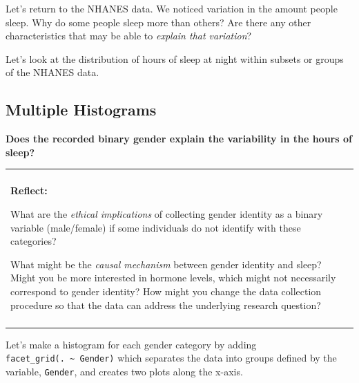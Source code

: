 \documentclass[
]{book}
\newenvironment{Shaded}{\begin{snugshade}}{\end{snugshade}}
\newcommand{\DataTypeTok}[1]{\textcolor[rgb]{0.13,0.29,0.53}{#1}}
\newcommand{\DecValTok}[1]{\textcolor[rgb]{0.00,0.00,0.81}{#1}}
\newcommand{\KeywordTok}[1]{\textcolor[rgb]{0.13,0.29,0.53}{\textbf{#1}}}
\newcommand{\NormalTok}[1]{#1}
\newcommand{\OperatorTok}[1]{\textcolor[rgb]{0.81,0.36,0.00}{\textbf{#1}}}
\newcommand{\StringTok}[1]{\textcolor[rgb]{0.31,0.60,0.02}{#1}}
\newenvironment{reflect}
{
    \begin{center}
    
    \begin{tabular}{|p{0.8\textwidth}|}
    \rowcolor{LightBlue}
    \hline\\
    \rowcolor{LightBlue}
    \textbf{Reflect:}
}
{
    \\\rowcolor{LightBlue}
    \\\hline
    \end{tabular} 
    \end{center}
}
\begin{document}
Let's return to the NHANES data. We noticed variation in the amount people sleep. Why do some people sleep more than others? Are there any other characteristics that may be able to \emph{explain that variation}?

Let's look at the distribution of hours of sleep at night within subsets or groups of the NHANES data.

\hypertarget{multiple-histograms}{%
\subsection{Multiple Histograms}\label{multiple-histograms}}

\textbf{Does the recorded binary gender explain the variability in the hours of sleep?}

\begin{reflect}
What are the \emph{ethical implications} of collecting gender identity
as a binary variable (male/female) if some individuals do not identify
with these categories?

What might be the \emph{causal mechanism} between gender identity and
sleep? Might you be more interested in hormone levels, which might not
necessarily correspond to gender identity? How might you change the data
collection procedure so that the data can address the underlying
research question?
\end{reflect}

Let's make a histogram for each gender category by adding \texttt{facet\_grid(.\ \textasciitilde{}\ Gender)} which separates the data into groups defined by the variable, \texttt{Gender}, and creates two plots along the x-axis.

\begin{Shaded}
\end{Shaded}
\end{document}
